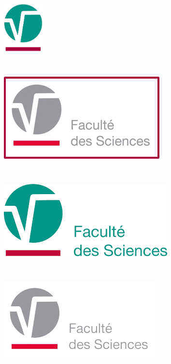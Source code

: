 \documentclass{umonsreport}
\begin{document}
\begin{figure}[H]
    \centering
    \begin{subfigure}[t]{.4\textwidth}
        \centering
        \includegraphics[height=7em]{logos/FS-small.png}
    \end{subfigure}
    ~
    \begin{subfigure}[t]{.4\textwidth}
        \centering
        \includegraphics[width=\textwidth]{logos/FS-grey-red-box.png}
    \end{subfigure}
    ~ \bigskip
    \begin{subfigure}[t]{.4\textwidth}
        \centering
        \includegraphics[width=\textwidth]{logos/FS.png}
    \end{subfigure}
    ~ 
    \begin{subfigure}[t]{.4\textwidth}
        \centering
        \includegraphics[width=\textwidth]{logos/FS-grey.png}

\end{subfigure}
\end{figure}
\end{document}
